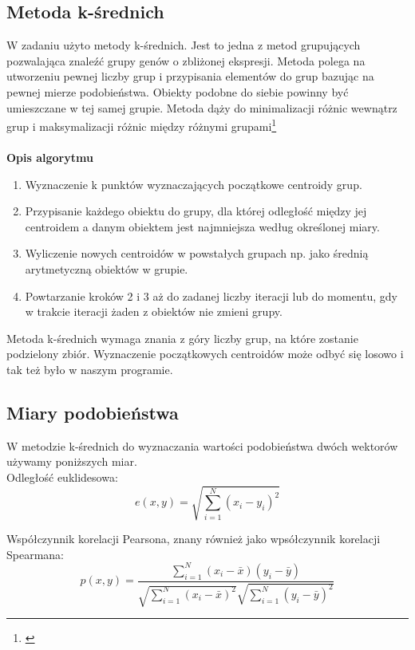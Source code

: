 \documentclass{classrep}
\begin{document}
\subsection{Metoda k-średnich}
W zadaniu użyto metody k-średnich. Jest to jedna z metod grupujących pozwalająca znaleźć grupy genów o zbliżonej ekspresji. Metoda polega na utworzeniu pewnej liczby grup i przypisania elementów do grup bazując na pewnej mierze podobieństwa. Obiekty podobne do siebie powinny być umieszczane w tej samej grupie. Metoda dąży do minimalizacji różnic wewnątrz grup i maksymalizacji różnic między różnymi grupami\footnote{\cite{metodyklasyfikacji}}\\\\
\textbf{Opis algorytmu}
\begin{enumerate}

\item Wyznaczenie k punktów wyznaczających początkowe centroidy grup.

\item Przypisanie każdego obiektu do grupy, dla której odległość między jej centroidem a danym obiektem jest najmniejsza według określonej miary.

\item Wyliczenie nowych centroidów w powstałych grupach np. jako średnią arytmetyczną obiektów w grupie.

\item Powtarzanie kroków 2 i 3 aż do zadanej liczby iteracji lub do momentu, gdy w trakcie iteracji żaden z obiektów nie zmieni grupy.\\
\end{enumerate}
Metoda k-średnich wymaga znania z góry liczby grup, na które zostanie podzielony zbiór. Wyznaczenie początkowych centroidów może odbyć się losowo i tak też było w naszym programie.
\subsection{Miary podobieństwa}
W metodzie k-średnich do wyznaczania wartości podobieństwa dwóch wektorów używamy poniższych miar.\\

Odległość euklidesowa:
\begin{equation}
  e(x, y) = \sqrt{\displaystyle \sum_{i = 1}^{N} (x_i - y_i)^2}
\end{equation}

Współczynnik korelacji Pearsona, znany również jako wpsółczynnik korelacji Spearmana:
\begin{equation}
  p(x,y) = \frac{\displaystyle\sum_{i = 1}^{N}(x_i - \bar{x})(y_i -
\bar{y})}{\sqrt{\displaystyle \sum_{i=1}^N (x_i - \bar{x})^2}\sqrt{\displaystyle
\sum_{i=1}^N (y_i - \bar{y})^2}}
\end{equation}
\end{document}
